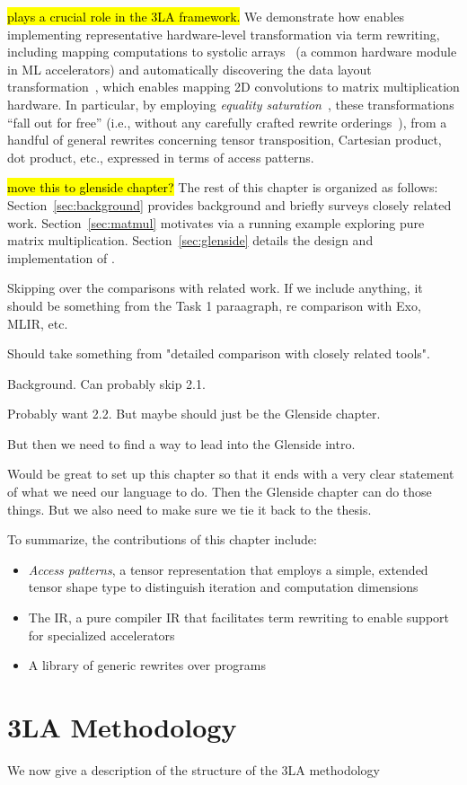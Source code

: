 \g \hl{
 plays a crucial role in the 3LA framework.
}
We demonstrate how \g
  enables implementing representative
  hardware-level transformation via term rewriting,
  including mapping computations
  to systolic arrays~\cite{jouppi2017tpu}
  (a common hardware module in ML accelerators)
  and automatically discovering the
   data layout transformation~\cite{im2col},
  which enables mapping 2D convolutions
  to matrix multiplication hardware.
In particular,
  by employing \textit{equality saturation}~\cite{willsey2021egg},
  these transformations ``fall out for free''
  (i.e., without any carefully crafted
  rewrite orderings~\cite{phase-ordering}),
  from a handful of general rewrites concerning tensor
  transposition, Cartesian product, dot product, etc.,
  expressed in terms of access patterns.


\hl{move this to glenside chapter?}
 The rest of this chapter is organized as follows:
Section~\ref{sec:background} provides background
  and briefly surveys closely related work.
Section~\ref{sec:matmul} motivates
  \g via a running example exploring
  pure matrix multiplication.
Section~\ref{sec:glenside} details the
  design and implementation of \g.


Skipping over the comparisons with related work.
If we include anything, it should be something
  from the Task 1 paraagraph, re comparison with Exo, MLIR, etc.

Should take something from "detailed comparison
  with closely related tools".

Background. Can probably skip 2.1.

Probably want 2.2. But maybe should just be the Glenside chapter.

But then we need to find a way
  to lead into the Glenside intro.

Would be great to set up this chapter
  so that it ends with a very clear statement
  of what we need our language to do.
Then the Glenside chapter can do those things.
But we also need to make sure
  we tie it back to the thesis.


  To summarize, the contributions of this chapter include:
\begin{itemize}
\item \textit{Access patterns},
  a tensor representation that employs a
  simple, extended tensor shape type to
  distinguish iteration and computation dimensions

\item The \g IR,
  a pure compiler IR that facilitates 
  term rewriting to enable support for
  specialized accelerators
  
\item A library of generic rewrites over \g programs
  
\end{itemize}


\section{3LA Methodology}


We now give a description
  of the structure
  of the 3LA methodology